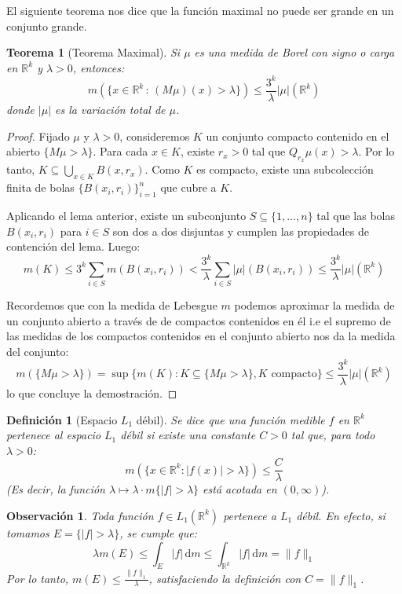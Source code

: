 \documentclass[12pt,a4paper]{article}
\theoremstyle{profesional}
\newtheorem{teorema}{Teorema}[section]
\theoremstyle{definicion-style}
\newtheorem{definicion}{Definición}[section]
\newtheorem{observacion}{Observación}[section]
\newcommand{\R}{\mathbb{R}}
\begin{document}
El siguiente teorema nos dice que la función maximal no puede ser grande en un conjunto grande.

\begin{teorema}[Teorema Maximal]
    Si \( \mu \) es una medida de Borel con signo o carga en \( \R^k \) y \( \lambda > 0 \), entonces:
    \[
        m\left(\{ x \in \R^k \, : \, (M\mu)(x) > \lambda \}\right) \leq \frac{3^k}{\lambda} |\mu|(\R^k)
    \]
    donde \( |\mu| \) es la variación total de \( \mu \).
\end{teorema}
\begin{proof}
    Fijado \( \mu \) y \( \lambda > 0 \), consideremos \( K \) un conjunto compacto contenido en el abierto \( \{ M \mu > \lambda \} \).
    Para cada \( x \in K \), existe \( r_x > 0 \) tal que \( Q_{r_x} \mu(x) > \lambda \). Por lo tanto, \( K \subseteq \bigcup_{x \in K} B(x, r_x) \). Como \( K \) es compacto, existe una subcolección finita de bolas \( {\{ B(x_i, r_i) \}}_{i = 1}^n \) que cubre a \( K \).

    Aplicando el lema anterior, existe un subconjunto \( S \subseteq \{ 1, \ldots, n \} \) tal que las bolas \( B(x_i, r_i) \) para \( i \in S \) son dos a dos disjuntas y cumplen las propiedades de contención del lema. Luego:
    \[
        m(K) \leq 3^k \sum_{i \in S} m(B(x_i, r_i)) < \frac{3^k}{\lambda} \sum_{i \in S} |\mu|(B(x_i, r_i)) \leq \frac{3^k}{\lambda} |\mu|(\R^k)
    \]

    Recordemos que con la medida de Lebesgue \( m \) podemos aproximar la medida de un conjunto abierto a través de de compactos contenidos en él i.e el supremo de las medidas de los compactos contenidos en el conjunto abierto nos da la medida del conjunto:
    \[
        m(\{ M \mu > \lambda \}) = \sup \{ m(K) : K \subseteq \{ M \mu > \lambda \}, K \text{ compacto} \} \leq \frac{3^k}{\lambda} |\mu|(\R^k)
    \]
    lo que concluye la demostración.
\end{proof}

\begin{definicion}[Espacio \( L_1 \) débil]
    Se dice que una función medible \( f \) en \( \R^k \) pertenece al espacio \( L_1 \) débil si existe una constante \( C > 0 \) tal que, para todo \( \lambda > 0 \):
    \[
        m \left( \{ x \in \R^k : |f(x)| > \lambda \} \right) \leq \frac{C}{\lambda}
    \]
    (Es decir, la función \( \lambda \mapsto \lambda \cdot m \{ |f| > \lambda \} \) está acotada en \( (0, \infty) \)).
\end{definicion}

\begin{observacion}
    Toda función \( f \in L_1(\R^k) \) pertenece a \( L_1 \) débil. En efecto, si tomamos \( E = \{ |f| > \lambda \} \), se cumple que:
    \[
        \lambda m(E) \leq \int_E |f| \, \mathrm{d} m \leq \int_{\R^k} |f| \, \mathrm{d} m = \|f\|_1
    \]
    Por lo tanto, \( m(E) \leq \frac{\|f\|_1}{\lambda} \), satisfaciendo la definición con \( C = \|f\|_1 \).
\end{observacion}
\end{document}
